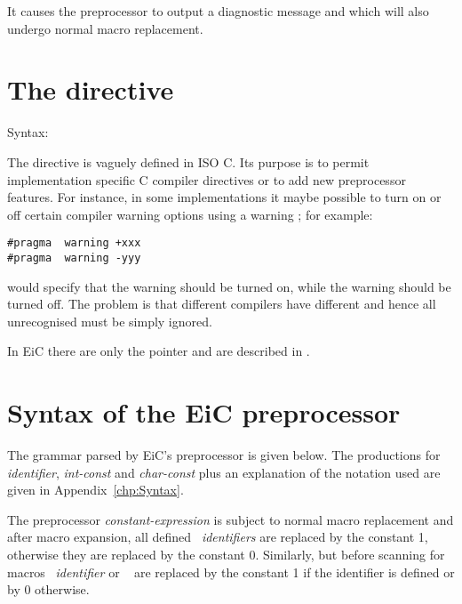 It causes the preprocessor to output a diagnostic message and which will 
also undergo normal macro replacement. 



\section{The  directive}
\label{sec:Pragma} 
Syntax:
\begin{production}
\end{production}

The  directive is vaguely defined in ISO C.  Its
purpose is to permit implementation specific C compiler directives or
to add new preprocessor features. For instance, in some
implementations it maybe possible to turn on or off certain compiler
warning options using a warning ; for example:

\begin{production}
\begin{verbatim}
#pragma  warning +xxx
#pragma  warning -yyy
\end{verbatim}
\end{production}

would specify that the  warning should be turned on, while the
 warning should be turned off. The problem is that different
compilers have different  and hence all unrecognised
 must be simply ignored.

In EiC there are only the pointer  and are described in
. 



\section{Syntax of the EiC preprocessor}
\label{sec:SyntaxPreprocessor} 

The grammar parsed by EiC's preprocessor is given below. The
productions for {\it identifier}, {\it int-const} and {\it char-const} plus
an explanation of the notation used are given in Appendix~\ref{chp:Syntax}. 


The preprocessor {\it constant-expression}  
is subject to normal macro
replacement and after macro expansion, all defined {\it~identifiers}
are replaced by the constant 1, otherwise they are replaced by the
constant 0.  Similarly, but before scanning for macros
~{\it identifier} or ~\T{)}
are replaced by the constant 1 if the identifier is defined or by 0 
otherwise.


